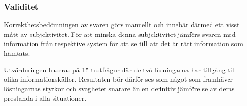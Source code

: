 \subsubsection{Validitet}
Korrekthetsbedömningen av svaren görs manuellt och innebär därmed ett visst mått av subjektivitet.
För att minska denna subjektivitet jämförs svaren med information från respektive system för att se till att det är rätt information som hämtats.

Utvärderingen baseras på 15 testfrågor där de två lösningarna har tillgång till olika informationskällor.
Resultaten bör därför ses som något som framhäver lösningarnas styrkor och svagheter snarare än en definitiv jämförelse av deras prestanda i alla situationer.

